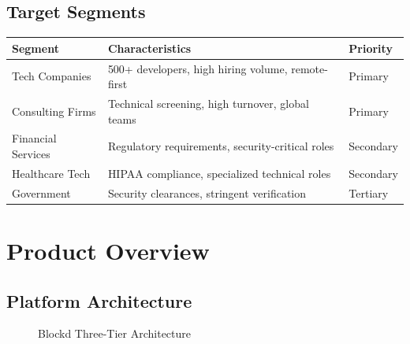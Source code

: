 \documentclass[11pt,letterpaper]{article}
\begin{document}
\subsection{Target Segments}

\begin{table}[H]
\centering
\small
\begin{tabularx}{\textwidth}{lXl}
\toprule
\textbf{Segment} & \textbf{Characteristics} & \textbf{Priority} \\
\midrule
Tech Companies & 500+ developers, high hiring volume, remote-first & Primary \\
Consulting Firms & Technical screening, high turnover, global teams & Primary \\
Financial Services & Regulatory requirements, security-critical roles & Secondary \\
Healthcare Tech & HIPAA compliance, specialized technical roles & Secondary \\
Government & Security clearances, stringent verification & Tertiary \\
\bottomrule
\end{tabularx}
\end{table}


\section{Product Overview}

\subsection{Platform Architecture}

\begin{figure}[H]
\centering
{}
\caption{Blockd Three-Tier Architecture}
\end{figure}
\end{document}
